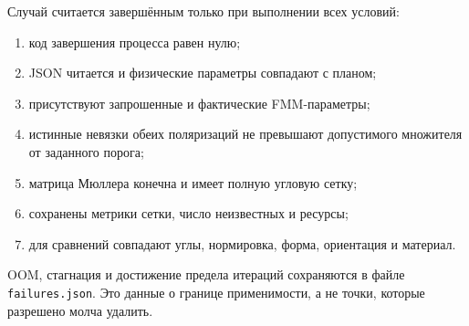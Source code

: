 \documentclass[12pt,a4paper]{article}
\begin{document}
Случай считается завершённым только при выполнении всех условий:
\begin{enumerate}
  \item код завершения процесса равен нулю;
  \item JSON читается и физические параметры совпадают с планом;
  \item присутствуют запрошенные и фактические FMM-параметры;
  \item истинные невязки обеих поляризаций не превышают допустимого множителя
        от заданного порога;
  \item матрица Мюллера конечна и имеет полную угловую сетку;
  \item сохранены метрики сетки, число неизвестных и ресурсы;
  \item для сравнений совпадают углы, нормировка, форма, ориентация и материал.
\end{enumerate}
OOM, стагнация и достижение предела итераций сохраняются в файле
\texttt{failures.json}. Это данные о границе применимости, а не точки,
которые разрешено молча удалить.
\end{document}

